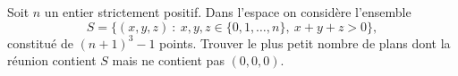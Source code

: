 Soit $n$ un entier strictement positif. Dans l'espace on considère l'ensemble
\[
S = \bigl\{(x, y, z) \ : \ x, y, z \in \{0, 1, \ldots, n\},\ x + y + z > 0\bigr\},
\]
constitué de $(n + 1)^3 - 1$ points. Trouver le plus petit nombre de plans dont la réunion contient $S$ mais ne
contient pas $(0, 0, 0)$.
